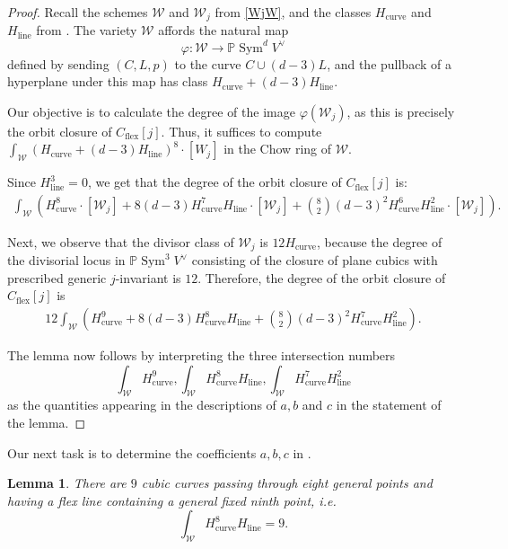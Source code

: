 \documentclass[12 pt, reqno]{amsart}
\newtheorem{lem}[thm]{Lemma}
\theoremstyle{definition}
\newcommand{\on}{\operatorname}
\newcommand{\mb}{\mathbb}
\renewcommand{\P}{\mb{P}}
\begin{document}
\begin{proof}\label{proof:Cflex}
  Recall the schemes $\mathcal{W}$ and $\mathcal{W}_j$ from
  \eqref{WjW}, and the classes $H_{\on{curve}}$ and $H_{\on{line}}$
  from . The variety $\mathcal{W}$ affords the natural map
  \[\varphi: \mathcal{W} \to \P \on{Sym}^{d}V^{\vee}\]
  defined by sending $(C,L,p)$ to the curve $C \cup (d-3)L$, and the
  pullback of a hyperplane under this map has class
  $H_{\on{curve}} + (d-3)H_{\on{line}}$.


  Our objective is to calculate the degree of the image
  $\varphi(\mathcal{W}_{j})$, as this is precisely the orbit closure
  of $C_{\on{flex}}[j]$.  Thus, it suffices to compute
  $\int_{\mathcal{W}}(H_{\on{curve}}+(d-3)H_{\on{line}})^{8} \cdot
  [W_j]$ in the Chow ring of $\mathcal{W}$.

  Since
  $H_{\on{line}}^{3}=0$, we get that the degree of the orbit closure
  of $C_{\on{flex}}[j]$ is:
  \begin{align}
    \label{eq:polyflex}
    \int_{\mathcal{W}} \left(H_{\on{curve}}^{8}\cdot [\mathcal{W}_j] + 8(d-3)H_{\on{curve}}^{7}H_{\on{line}}\cdot [\mathcal{W}_j] + {8 \choose 2}(d-3)^{2}H_{\on{curve}}^{6}H_{\on{line}}^{2}\cdot [\mathcal{W}_j] \right).
  \end{align}

  Next, we observe that the divisor class of $\mathcal{W}_j$ is
  $12 H_{\on{curve}}$, because the degree of the divisorial locus in
  $\P \on{Sym}^{3}V^{\vee}$ consisting of the closure of plane cubics
  with prescribed generic $j$-invariant is $12$.  Therefore, the
  degree of the orbit closure of $C_{\on{flex}}[j]$ is
  \begin{align*}
    12 \int_{\mathcal{W}}\left( H_{\on{curve}}^{9} + 8(d-3)H_{\on{curve}}^{8}H_{\on{line}} + {8 \choose 2}(d-3)^{2}H_{\on{curve}}^{7}H_{\on{line}}^{2} \right).
  \end{align*}

  The lemma now follows by interpreting the three intersection numbers
  \[\int_{\mathcal{W}}H_{\on{curve}}^{9}, \int_{\mathcal{W}}
    H_{\on{curve}}^{8}H_{\on{line}}, \int_{\mathcal{W}}
    H_{\on{curve}}^{7}H_{\on{line}}^{2}\] as the quantities appearing
  in the descriptions of $a, b$ and $c$ in the statement of the lemma.
  \end{proof}

  Our next task is to determine the coefficients $a,b,c$ in
  .
  

  \begin{lem}
    \label{lem:bCflex}
    There are $9$ cubic curves passing through eight general points
    and having a flex line containing a general fixed ninth point,
    i.e. \[\int_{\mathcal{W}}H_{\on{curve}}^{8}H_{\on{line}} = 9.\]
  \end{lem}
\end{document}
